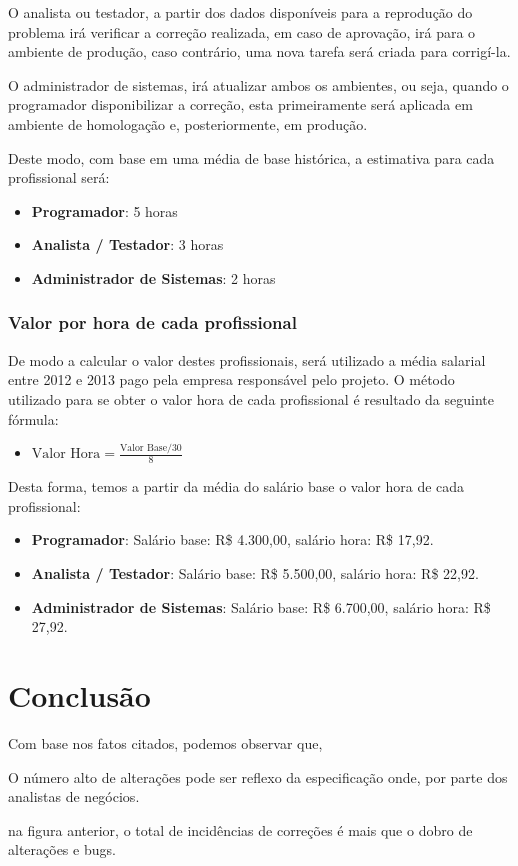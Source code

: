 \documentclass[11pt, a4paper]{article}
\begin{document}
O analista ou testador, a partir dos dados disponíveis para a reprodução do problema irá verificar a correção realizada, em caso de aprovação, irá para o ambiente de produção, caso contrário, uma nova tarefa será criada para corrigí-la.

O administrador de sistemas, irá atualizar ambos os ambientes, ou seja, quando o programador disponibilizar a correção, esta primeiramente será aplicada em ambiente de homologação e, posteriormente, em produção.

Deste modo, com base em uma média de base histórica, a estimativa para cada profissional será:

\begin{itemize}
	\item \textbf{Programador}: 5 horas
	\item \textbf{Analista / Testador}: 3 horas
	\item \textbf{Administrador de Sistemas}: 2 horas
\end{itemize}

\subsubsection{Valor por hora de cada profissional}
De modo a calcular o valor destes profissionais, será utilizado a média salarial entre 2012 e 2013 pago pela empresa responsável pelo projeto. O método utilizado para se obter o valor hora de cada profissional é resultado da seguinte fórmula: 

\begin{itemize}
  \item[] \textbf{$\text{Valor Hora}=\frac{\text{Valor Base} / 30}{8}$}
\end{itemize}

Desta forma, temos a partir da média do salário base o valor hora de cada profissional:

\begin{itemize}
	\item \textbf{Programador}: Salário base: R\$ 4.300,00, salário hora: R\$ 17,92.
	\item \textbf{Analista / Testador}: Salário base: R\$ 5.500,00, salário hora: R\$ 22,92.
	\item \textbf{Administrador de Sistemas}: Salário base: R\$ 6.700,00, salário hora: R\$ 27,92.
\end{itemize}

\section{Conclusão}
Com base nos fatos citados, podemos observar que, 

O número alto de alterações pode ser reflexo da especificação onde, por parte dos analistas de negócios.

 na figura anterior, o total de incidências de correções é mais que o dobro de alterações e bugs.


\end{document}
